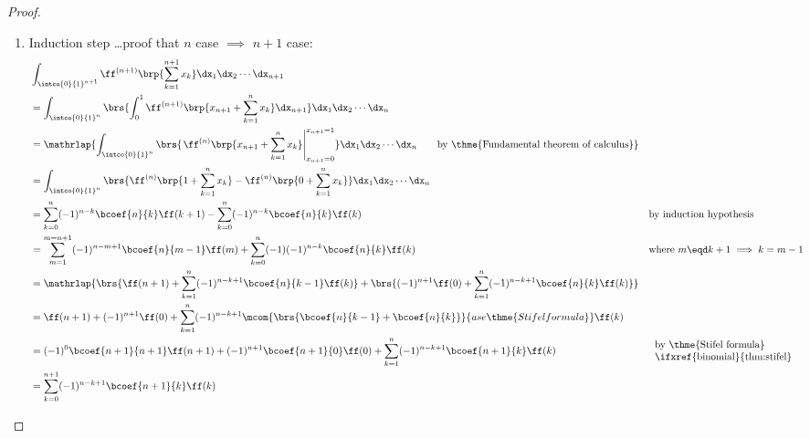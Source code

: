 \begin{proof}
\begin{enumerate}
    \item Induction step \ldots proof that $n$ case $\implies$ $n+1$ case:
      \begin{align*}
          &\int_{\intco{0}{1}^{n+1}} \ff^{(n+1)}\brp{\sum_{k=1}^{n+1} x_k} \dx_1\dx_2\cdots\dx_{n+1}
        \\&= \int_{\intco{0}{1}^{n}}\brs{\int_0^1 \ff^{(n+1)}\brp{x_{n+1}+\sum_{k=1}^{n} x_k} \dx_{n+1}}\dx_1\dx_2\cdots\dx_{n}
        \\&= \mathrlap{%
             \int_{\intco{0}{1}^n}\brs{\left. \ff^{(n)}\brp{x_{n+1}+\sum_{k=1}^n x_k}\right|_{x_{n+1}=0}^{x_{n+1}=1}} \dx_1\dx_2\cdots\dx_n
             \qquad\text{by \thme{Fundamental theorem of calculus}}}
        \\&= \int_{\intco{0}{1}^n}\brs{\ff^{(n)}\brp{1+\sum_{k=1}^n x_k}-\ff^{(n)}\brp{0+\sum_{k=1}^n x_k}} \dx_1\dx_2\cdots\dx_n
        \\&= \sum_{k=0}^n (-1)^{n-k}\bcoef{n}{k}\ff(k+1) - \sum_{k=0}^n (-1)^{n-k}\bcoef{n}{k}\ff(k)
          && \text{by induction hypothesis}
        \\&= \sum_{m=1}^{m=n+1} (-1)^{n-m+1}\bcoef{n}{m-1}\ff(m) + \sum_{k=0}^n (-1)(-1)^{n-k}\bcoef{n}{k}\ff(k)
          && \text{where $m\eqd k+1\implies k=m-1$}
        \\&=\mathrlap{%
              \brs{ \ff(n+1)+ \sum_{k=1}^{n} (-1)^{n-k+1}\bcoef{n}{k-1}\ff(k) }
            + \brs{ (-1)^{n+1} \ff(0) + \sum_{k=1}^n (-1)^{n-k+1}\bcoef{n}{k}\ff(k)}
            }
        \\&= \ff(n+1) + (-1)^{n+1}\ff(0)
            + \sum_{k=1}^{n} (-1)^{n-k+1}\mcom{\brs{\bcoef{n}{k-1}+\bcoef{n}{k}}}{use \thme{Stifel formula}}\ff(k)
        \\&= (-1)^0\bcoef{n+1}{n+1}\ff(n+1) + (-1)^{n+1}\bcoef{n+1}{0}\ff(0)
            + \sum_{k=1}^{n} (-1)^{n-k+1}\bcoef{n+1}{k}\ff(k)
          && \text{\begin{tabular}{l}by \thme{Stifel formula}\\\ifxref{binomial}{thm:stifel}\end{tabular}}
        \\&= \sum_{k=0}^{n+1} (-1)^{n-k+1}\bcoef{n+1}{k}\ff(k)
      \end{align*}
  \end{enumerate}
\end{proof}

